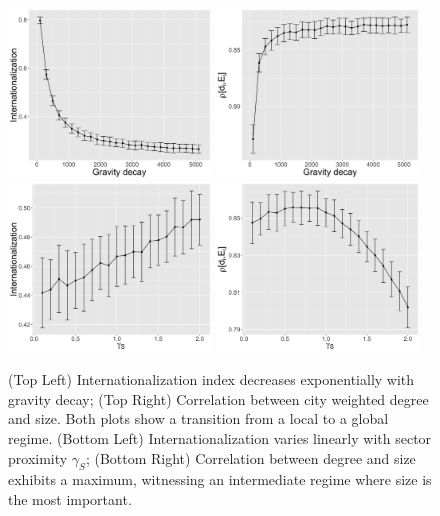 \documentclass[11pt]{article}
\begin{document}
\begin{figure}
	\includegraphics[width=0.48\textwidth,height=0.2\textheight]{figures/internationalization-gravityDecay_errorbars.png}
    \includegraphics[width=0.48\textwidth,height=0.2\textheight]{figures/rhoDegreeSize-gravityDecay_errorbars.png}\\
    \includegraphics[width=0.48\textwidth,height=0.2\textheight]{figures/internationalization-gammaSectors_errorbars.png}
    \includegraphics[width=0.48\textwidth,height=0.2\textheight]{figures/rhoDegreeSize-gammaSectors_errorbars.png}
    \caption{(Top Left) Internationalization index decreases exponentially with gravity decay; (Top Right) Correlation between city weighted degree and size. Both plots show a transition from a local to a global regime. (Bottom Left) Internationalization varies linearly with sector proximity $\gamma_S$; (Bottom Right) Correlation between degree and size exhibits a maximum, witnessing an intermediate regime where size is the most important. \label{fig:onefactor}}
\end{figure}
\end{document}
